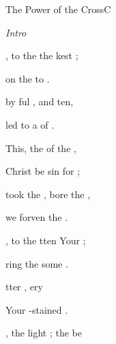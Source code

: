 \documentclass[12pt]{book}
\begin{document}
\begin{song}{The Power of the Cross}{C}{}{}{}{}
\begin{SBExtraKeys}{
    \CBPageBrk

    \emph{Intro} \Ch{[Em}{}  \Ch{G]x2}{}
    \begin{SBVerse}
        
        , to  the  
             the kest ; 

         on the  to 
            .

         by ful , 
             and ten, 

        led to a  of .

    \end{SBVerse}

    \begin{SBChorus}

        This, the  of the ,

        Christ be sin for ;

        took the , bore the ,

        we  forven  the . 
            \Ch{[Em}{}  \Ch{C]}{}

    \end{SBChorus}

    \begin{SBVerse}
        
        , to  the  
            tten  Your ; 

        ring the some
              .

         tter , 
            ery  

         Your -stained .

    \end{SBVerse}

    \begin{SBVerse}
        
        , the light ; 
             the  be


\end{SBVerse}}
\end{SBExtraKeys}
\end{song}
\end{document}
